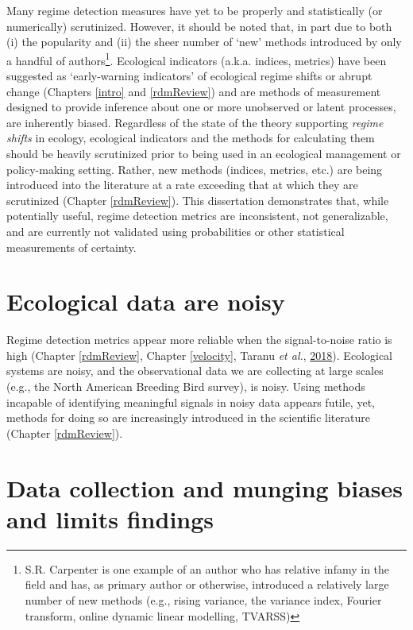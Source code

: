 \documentclass[12pt,twoside,openany]{reedthesis}
\begin{document}
Many regime detection measures have yet to be properly and statistically (or numerically) scrutinized. However, it should be noted that, in part due to both (i) the popularity and (ii) the sheer number of `new' methods introduced by only a handful of authors\footnote{S.R. Carpenter is one example of an author who has relative infamy in the field and has, as primary author or otherwise, introduced a relatively large number of new methods (e.g., rising variance, the variance index, Fourier transform, online dynamic linear modelling, TVARSS)}. Ecological indicators (a.k.a. indices, metrics) have been suggested as `early-warning indicators' of ecological regime shifts or abrupt change (Chapters \ref{intro} and \ref{rdmReview}) and are methods of measurement designed to provide inference about one or more unobserved or latent processes, are inherently biased. Regardless of the state of the theory supporting \emph{regime shifts} in ecology, ecological indicators and the methods for calculating them should be heavily scrutinized prior to being used in an ecological management or policy-making setting. Rather, new methods (indices, metrics, etc.) are being introduced into the literature at a rate exceeding that at which they are scrutinized (Chapter \ref{rdmReview}). This dissertation demonstrates that, while potentially useful, regime detection metrics are inconsistent, not generalizable, and are currently not validated using probabilities or other statistical measurements of certainty.

\hypertarget{ecological-data-are-noisy}{%
\section{Ecological data are noisy}\label{ecological-data-are-noisy}}

Regime detection metrics appear more reliable when the signal-to-noise ratio is high (Chapter \ref{rdmReview}, Chapter \ref{velocity}, Taranu \emph{et al.}, \protect\hyperlink{ref-taranu2018can}{2018}). Ecological systems are noisy, and the observational data we are collecting at large scales (e.g., the North American Breeding Bird survey), is noisy. Using methods incapable of identifying meaningful signals in noisy data appears futile, yet, methods for doing so are increasingly introduced in the scientific literature (Chapter \ref{rdmReview}).

\hypertarget{data-collection-and-munging-biases-and-limits-findings}{%
\section{Data collection and munging biases and limits findings}\label{data-collection-and-munging-biases-and-limits-findings}}
\end{document}
